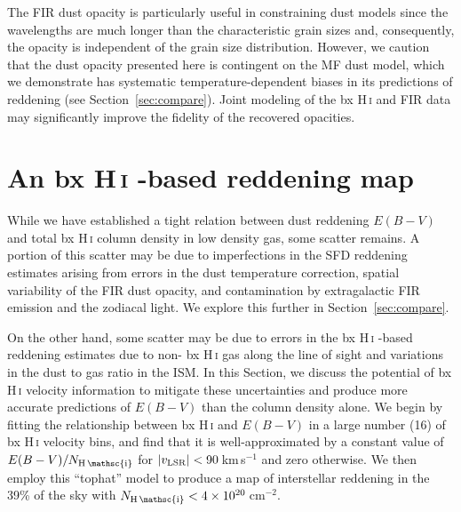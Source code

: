 \documentclass[iop,apj]{emulateapj}
\makeatletter
\def\testbx{bx}%
\DeclareRobustCommand{\ion}[2]{%
\relax\ifmmode
\ifx\testbx\f@series
{\mathbf{#1\,\mathsc{#2}}}\else
{\mathrm{#1\,\mathsc{#2}}}\fi
\else\textup{#1\,{\mdseries\textsc{#2}}}%
\fi}
\makeatother
\begin{document}
The FIR dust opacity is particularly useful in constraining dust models since the wavelengths are much longer than the characteristic grain sizes and, consequently, the opacity is independent of the grain size distribution. However, we caution that the dust opacity presented here is contingent on the MF dust model, which we demonstrate has systematic temperature-dependent biases in its predictions of reddening (see Section~\ref{sec:compare}). Joint modeling of the \ion{H}{i} and FIR data may significantly improve the fidelity of the recovered opacities.

\section{An \ion{H}{i}-based reddening map}
\label{sec:reddening_map}

While we have established a tight relation between dust reddening $E(B-V)$ and total \ion{H}{i} column density in low density gas, some scatter remains. A portion of this scatter may be due to imperfections in the SFD reddening estimates arising from errors in the dust temperature correction, spatial variability of the FIR dust opacity, and contamination by extragalactic FIR emission and the zodiacal light. We explore this further in Section~\ref{sec:compare}. 

On the other hand, some scatter may be due to errors in the \ion{H}{i}-based reddening estimates due to non-\ion{H}{i} gas along the line of sight and variations in the dust to gas ratio in the ISM. In this Section, we discuss the potential of \ion{H}{i} velocity information to mitigate these uncertainties and produce more accurate predictions of $E(B-V)$ than the column density alone. We begin by fitting the relationship between \ion{H}{i} and $E(B-V)$ in a large number (16) of \ion{H}{i} velocity bins, and find that it is well-approximated by a constant value of $E(B-V)/N_\ion{H}{i}$ for $|v_{\rm LSR}| < 90$\,km\,s$^{-1}$ and zero otherwise. We then employ this ``tophat'' model to produce a map of interstellar reddening in the 39\% of the sky with $N_\ion{H}{i} < 4\times10^{20}$\,cm$^{-2}$.

\end{document}
